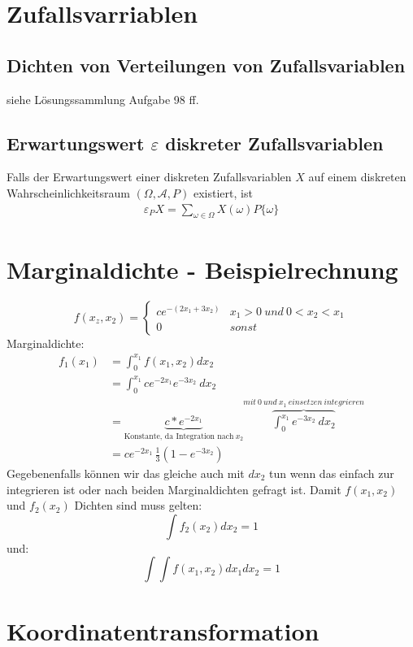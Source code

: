 \documentclass{article}
\begin{document}
	\section{Zufallsvarriablen}
	\subsection{Dichten von Verteilungen von Zufallsvariablen}
	siehe Lösungssammlung Aufgabe 98 ff.	
	
	\subsection{Erwartungswert $\varepsilon$ diskreter Zufallsvariablen}
	Falls der Erwartungswert einer diskreten Zufallsvariablen $X$ auf
	einem diskreten Wahrscheinlichkeitsraum $(\Omega, \mathcal{A}, P)$ existiert,
	ist
	\begin{align}
	\varepsilon_P X = \sum_{\omega \in \Omega} X(\omega)P\{\omega\}
	\end{align}
	
	\section{Marginaldichte - Beispielrechnung}
	\[	
	f(x_z,x_2)=
	\begin{cases}
	ce^{-(2x_1+3x_2)} & x_1  > 0 \: und \: 0 < x_2 <x_1 \\
	0 & sonst
	\end{cases}
	\]
	Marginaldichte:
	\[
	\begin{split}
	f_1(x_1) 	& = \int_{0}^{x_1} f(x_1,x_2) dx_2 \\
	& = \int_{0}^{x_1} ce^{-2x_1}e^{-3x_2} \: dx_2 \\
	& = \underbrace{c*e^{-2x_1}}_{\text{Konstante, da Integration nach} \: x_2}  \overbrace{\int_{0}^{x_1} e^{-3x_2} \: dx_2}^{mit \: 0 \: und \: x_1 \: einsetzen \: integrieren} \\
	& = ce^{-2x_1}\, \frac{1}{3} (1-e^{-3x_2} )
	\end{split}
	\]
	Gegebenenfalls können wir das gleiche auch mit $dx_2$ tun wenn das einfach zur integrieren ist oder nach beiden Marginaldichten gefragt ist.
	Damit $f(x_1,x_2)$ und $f_2(x_2)$ Dichten sind muss gelten:
	\[
	\int f_2(x_2) dx_2 = 1
	\]
	und:
	\[
	\int \int f(x_1,x_2) dx_1 dx_2 = 1
	\]
	\section{Koordinatentransformation}
\end{document}
